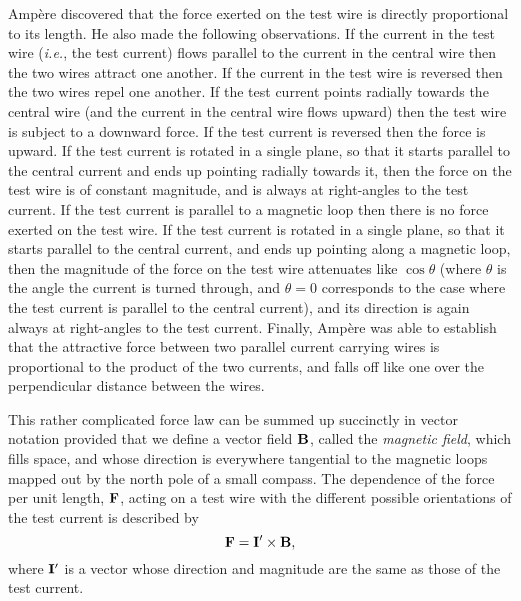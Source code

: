 Amp\`{e}re discovered that the force exerted on the test wire is directly proportional
to its length. He also made the following observations.
If the current in the test wire 
({\em i.e.}, the test current) flows parallel to the current in the central wire 
then the two wires  attract one another. If the current in the test
wire is reversed then the two wires  repel one another.
If the test current points radially towards the central wire 
(and the current in the central wire flows upward) then the test wire
is subject to a downward force. If the test current is reversed then the force is
upward. If the test current is rotated in a single plane, so that it starts
parallel to the central current and ends up pointing radially
towards it, then the force on
the test wire is of constant magnitude, and is always at right-angles to the
test current. If the test current is parallel to a magnetic loop then there is
no force exerted on the test wire. If the test current is rotated in
a single plane, so that it starts parallel to the central current, and ends up
pointing along a magnetic loop, then the magnitude of the force on the
test wire attenuates like $\cos\theta$ (where $\theta$ is the angle the current
is turned through, and $\theta=0$ corresponds to the
case where the test current is parallel to the central current),
 and its direction is again always at right-angles to
the test current. Finally, Amp\`{e}re was able to establish that the attractive
force between two parallel current carrying wires is proportional to the product of
the two currents, and
 falls off like one over the perpendicular
distance between the wires.

This rather complicated force law can be summed up succinctly in vector notation
provided that we define a vector field ${\bf B}$, called the {\em magnetic field}, 
which fills space, and
whose direction is everywhere   tangential  to the 
magnetic loops mapped out by the north
pole of a small
  compass. The dependence of the force per unit length, ${\bf F}$, acting on a
test wire with the different 
possible orientations of the test current is described  by 
\begin{equation}\label{e8.1}
{\bf F} = {\bf I}' \times{\bf B},
\end{equation}
where ${\bf I}'$ is a vector whose direction and magnitude are the same as those
of the test current. 

